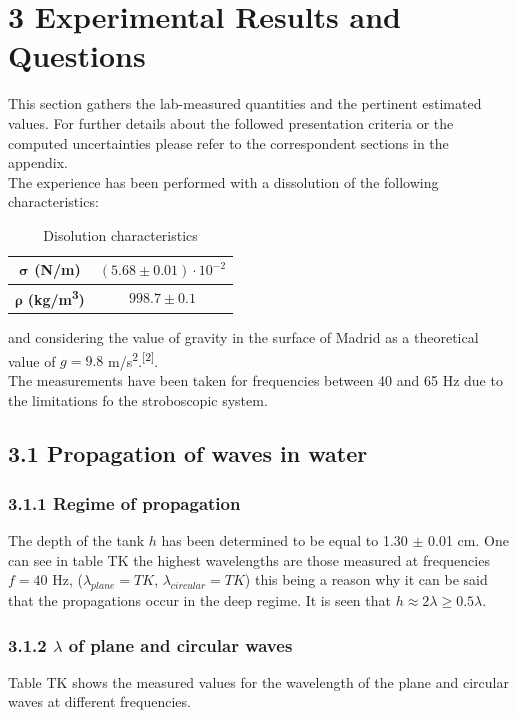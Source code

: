 \documentclass[a4paper, 12pt]{article}
\begin{document}
	\section{3 Experimental Results and Questions}
	This section gathers the lab-measured quantities and the pertinent estimated values. For further details about the followed presentation criteria or the computed uncertainties please refer to the correspondent sections in the appendix. \\
	
	The experience has been performed with a dissolution of the following characteristics:
	\begin{table}[hbt!]
		\centering
		\begin{tabular}{|c | c|}
			\hline 
			$\boldsymbol{\sigma}$ \textbf{ (N/m)} & $(5.68 \pm 0.01) \cdot 10^{-2}$ \\
			\hline
			$\boldsymbol{\rho}$ \textbf{ (kg/m\textsuperscript{3})} & $ 998.7 \pm 0.1 $ \\
			\hline
		\end{tabular}
		\caption{Disolution characteristics}
	\end{table}

	and considering the value of gravity in the surface of Madrid as a theoretical value of $g = 9.8$ m/s\textsuperscript{2}.\textsuperscript{[2]}. \\
	The measurements have been taken for frequencies between 40 and 65 Hz due to the limitations fo the stroboscopic system.
	\subsection{3.1 Propagation of waves in water}
	\subsubsection{3.1.1 Regime of propagation}
		The depth of the tank $h$ has been determined to be equal to 1.30 $\pm$ 0.01 cm. One can see in table TK the highest wavelengths are those measured at frequencies $f = 40$ Hz, ($\lambda_{plane} = TK$, $\lambda_{circular} = TK$) this being a reason why it can be said that the propagations occur in the deep regime. It is seen that $h \approx 2\lambda \geq 0.5\lambda$. \\
	\subsubsection{3.1.2 $\lambda$ of plane and circular waves}
		Table TK shows the measured values for the wavelength of the plane and circular waves at different frequencies.
		
\end{document}
